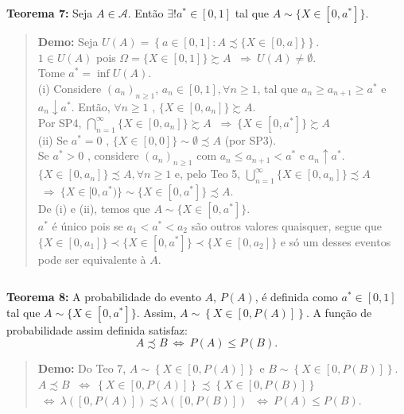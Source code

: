 \documentclass[
]{book}
\begin{document}
\textbf{Teorema 7:} Seja \(A \in \mathcal{A}\). Então \(\exists! a^* \in [0,1]\) tal que \(A \sim \{X \in [0,a^*]\}\).

\begin{quote}
\textbf{Demo:} Seja \(U(A) = \left\{ a \in [0,1] : A \precsim \{X \in [0,a]\} \right\}\).\\
\(1 \in U(A)\) pois \(\Omega = \{X \in [0,1]\} \succsim A\) \(~\Rightarrow~ U(A) \neq \emptyset\).\\
Tome \(a^* = \inf U(A)\).\\
\(~\)\\
(i) Considere \((a_n)_{n \geq 1}\), \(a_n \in [0,1], \forall n \geq 1\), tal que \(a_n \geq a_{n+1} \geq a^*\) e \(a_n \downarrow a^*\). Então, \(\forall n \geq 1\) , \(\{X \in [0,a_n]\} \succsim A\).\\
Por SP4, \(\displaystyle \bigcap_{n=1}^\infty \{X \in [0,a_n]\} \succsim A\) \(~\Rightarrow~ \{X \in [0,a^*]\} \succsim A\)\\
\(~\)\\
(ii) Se \(a^*=0\) , \(\{X \in [0,0]\} \sim \emptyset \precsim A\) (por SP3).\\
Se \(a^* > 0\) , considere \((a_n)_{n \geq 1}\) com \(a_n \leq a_{n+1} < a^*\) e \(a_n \uparrow a^*\).\\
\(\{X \in [0,a_n]\} \precsim A, \forall n \geq 1\) e, pelo Teo 5, \(\displaystyle \bigcup_{n=1}^{\infty} \{X \in [0,a_n]\} \precsim A\) \(~\Rightarrow~ \{X \in [0,a^*)\} \sim \{X \in [0,a^*]\} \precsim A\).\\
\(~\)\\
De (i) e (ii), temos que \(A \sim \{X \in [0,a^*]\}\).\\
\(~\)\\
\(a^*\) é único pois se \(a_1 < a^* < a_2\) são outros valores quaisquer, segue que \(\{X \in [0,a_1]\} \prec \{X \in [0,a^*]\} \prec \{X \in [0,a_2]\}\) e só um desses eventos pode ser equivalente à \(A\).
\end{quote}

\(~\)

\textbf{Teorema 8:} A probabilidade do evento \(A\), \(P(A)\), é definida como \(a^* \in [0,1]\) tal que \(A \sim \{X \in [0,a^*]\}\). Assim, \(A \sim \left\{X \in \left[0,P(A)\right]\right\}\). A função de probabilidade assim definida satisfaz:
\[A \precsim B ~\Leftrightarrow~ P(A) \leq P(B).\]

\begin{quote}
\textbf{Demo:} Do Teo 7, \(A \sim \left\{X \in \left[0,P(A)\right]\right\}\) e \(B \sim \left\{X \in \left[0,P(B)\right]\right\}\).\\
\(A \precsim B\) \(~\Leftrightarrow~ \left\{X \in \left[0,P(A)\right]\right\} \precsim \left\{X \in \left[0,P(B)\right]\right\}\) \(~\Leftrightarrow~ \lambda \left([0,P(A)]\right) \precsim \lambda \left([0,P(B)]\right)\) \(~\Leftrightarrow~ P(A) \leq P(B).\)
\end{quote}
\end{document}
